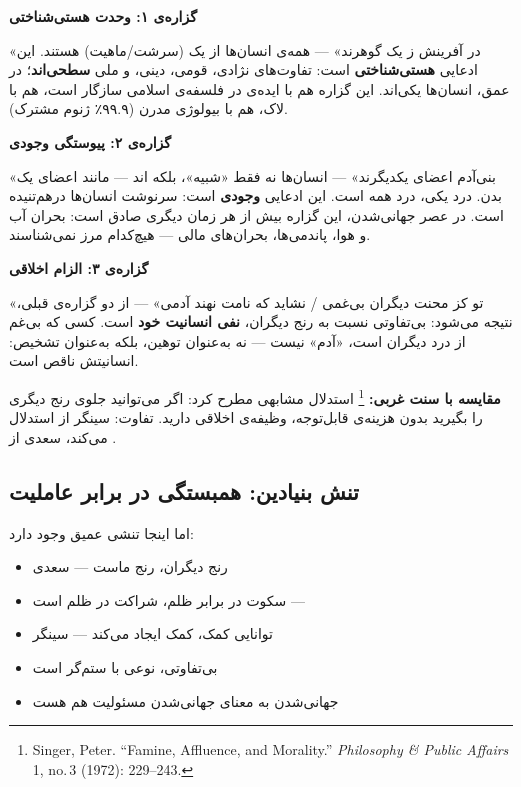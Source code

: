 \begin{tcolorbox}[wavebox, title={سه گزاره‌ی بنیادین}]
\textbf{گزاره‌ی ۱: وحدت هستی‌شناختی}

«در آفرینش ز یک گوهرند» — همه‌ی انسان‌ها از یک 
(سرشت/ماهیت) هستند. این ادعایی \textbf{هستی‌شناختی} است: تفاوت‌های نژادی،
قومی، دینی، و ملی \textbf{سطحی‌اند}؛ در عمق، انسان‌ها یکی‌اند. این
گزاره هم با ایده‌ی  در فلسفه‌ی اسلامی سازگار است، هم با
 لاک، هم با بیولوژی مدرن (۹۹.۹٪ ژنوم مشترک).

\tcblower

\textbf{گزاره‌ی ۲: پیوستگی وجودی}

«بنی‌آدم اعضای یکدیگرند» — انسان‌ها نه فقط «شبیه»، بلکه
‌اند — مانند اعضای یک بدن. درد یکی، درد همه است.
این ادعایی \textbf{وجودی} است: سرنوشت انسان‌ها درهم‌تنیده است. در عصر
جهانی‌شدن، این گزاره بیش از هر زمان دیگری صادق است: بحران آب و هوا،
پاندمی‌ها، بحران‌های مالی — هیچ‌کدام مرز نمی‌شناسند.

\tcblower

\textbf{گزاره‌ی ۳: الزام اخلاقی}

«تو کز محنت دیگران بی‌غمی / نشاید که نامت نهند آدمی» — از دو گزاره‌ی
قبلی،  نتیجه می‌شود: بی‌تفاوتی نسبت به رنج
دیگران، \textbf{نفی انسانیت خود} است. کسی که بی‌غم از درد دیگران است،
«آدم» نیست — نه به‌عنوان توهین، بلکه به‌عنوان تشخیص: انسانیتش ناقص
است.

\textbf{مقایسه با سنت غربی:} \footnote{Singer,
Peter. ``Famine, Affluence, and Morality.'' \textit{Philosophy \& Public
Affairs} 1, no.\,3 (1972): 229--243.} استدلال مشابهی مطرح کرد: اگر
می‌توانید جلوی رنج دیگری را بگیرید بدون هزینه‌ی قابل‌توجه، وظیفه‌ی
اخلاقی دارید. تفاوت: سینگر از  استدلال می‌کند، سعدی
از .
\end{tcolorbox}


\subsection{تنش بنیادین: همبستگی در برابر عاملیت}

اما اینجا تنشی عمیق وجود دارد:

\begin{tcolorbox}[successbox, title={از یک سو: وظیفه‌ی کمک}]
\begin{itemize}
\item رنج دیگران، رنج ماست — سعدی
\item سکوت در برابر ظلم، شراکت در ظلم است — 
\item توانایی کمک،  کمک ایجاد می‌کند — سینگر
\item بی‌تفاوتی، نوعی  با ستم‌گر است
\item جهانی‌شدن به معنای جهانی‌شدن مسئولیت هم هست
\end{itemize}
\end{tcolorbox}


